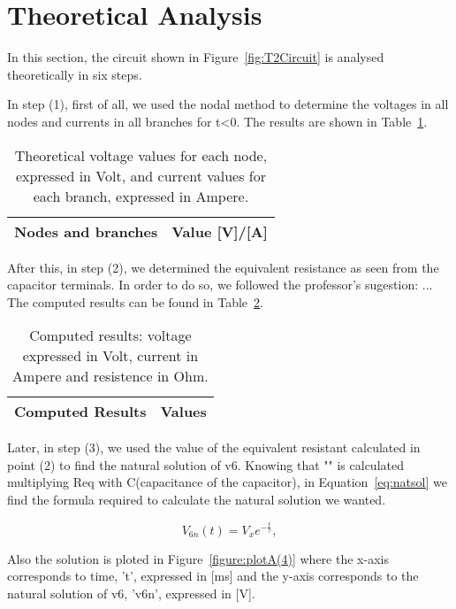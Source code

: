 \section{Theoretical Analysis}
\label{sec:analysis}

In this section, the circuit shown in Figure~\ref{fig:T2Circuit} is analysed theoretically in six steps.

In step (1), first of all, we used the nodal method to determine the voltages in all nodes and currents in all branches for t<0. The results are shown in Table~\ref{tab:TA1}.

\begin{table}[h]
  \centering
  \begin{tabular}{|l|r|}
    \hline    
    {\bf Nodes and branches} & {\bf Value [V]/[A]} \\ \hline
    
  \end{tabular}
  \caption{Theoretical voltage values for each node, expressed in Volt, and current values for each branch, expressed in Ampere.}
  \label{tab:TA1}
\end{table}

After this, in step (2), we determined the equivalent resistance as seen from the capacitor terminals. In order to do so, we followed the professor's sugestion: ... The computed results can be found in Table~\ref{tab:TA2}.

\begin{table}[h]
  \centering
  \begin{tabular}{|l|r|}
    \hline    
    {\bf Computed Results} & {\bf Values} \\ \hline
    
  \end{tabular}
  \caption{Computed results: voltage expressed in Volt, current in Ampere and resistence in Ohm.}
  \label{tab:TA2}
\end{table}

Later, in step (3), we used the value of the equivalent resistant calculated in point (2) to find the natural solution of v6. Knowing that "\tau" is calculated multiplying Req with C(capacitance of the capacitor), in Equation~\ref{eq:natsol} we find the formula required to calculate the natural solution we wanted. 

\begin{equation}
  V_{6n}(t) = V_{x}e^{-\frac{t}{\tau}},
  \label{eq:natsol}
\end{equation}

Also the solution is ploted in Figure~\ref{figure:plotA(4)} where the x-axis corresponds to time, 't', expressed in [ms] and the y-axis corresponds to the natural solution of v6, 'v6n', expressed in [V].

